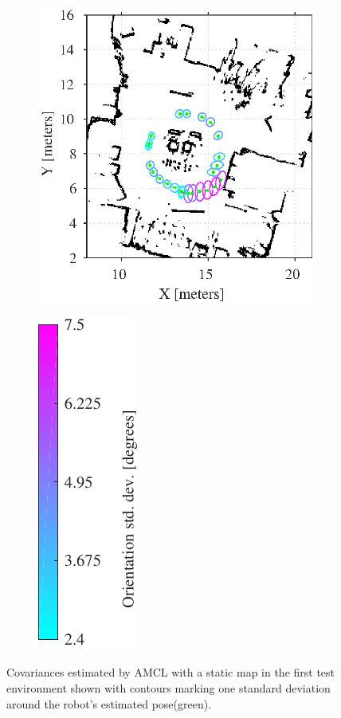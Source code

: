 \begin{figure}[htbp]
	\centering
	\begin{subfigure}[t]{0.55\textwidth}
		\includegraphics[scale=1.0]{chapters/evaluation/figures/localization_static_map1}		
	\end{subfigure}
	\begin{subfigure}[t]{0.2\textwidth}
		\includegraphics[scale=1.0]{chapters/evaluation/figures/localization_std_color_bar-crop}
	\end{subfigure}
	\label{fig:amcl_covariance_static1}
	\caption{Covariances estimated by AMCL with a static map in the first test environment shown with contours marking one standard deviation around the robot's estimated pose(green).}
\end{figure}

